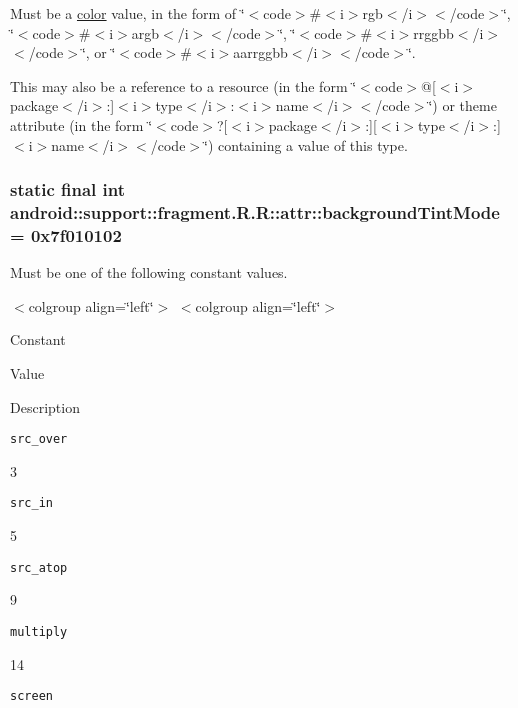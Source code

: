 Must be a \hyperlink{classandroid_1_1support_1_1fragment_1_1_r_1_1color}{color} value, in the form of \char`\"{}$<$code$>$\#$<$i$>$rgb$<$/i$>$$<$/code$>$\char`\"{}, \char`\"{}$<$code$>$\#$<$i$>$argb$<$/i$>$$<$/code$>$\char`\"{}, \char`\"{}$<$code$>$\#$<$i$>$rrggbb$<$/i$>$$<$/code$>$\char`\"{}, or \char`\"{}$<$code$>$\#$<$i$>$aarrggbb$<$/i$>$$<$/code$>$\char`\"{}. 

This may also be a reference to a resource (in the form \char`\"{}$<$code$>$@\mbox{[}$<$i$>$package$<$/i$>$:\mbox{]}$<$i$>$type$<$/i$>$:$<$i$>$name$<$/i$>$$<$/code$>$\char`\"{}) or theme attribute (in the form \char`\"{}$<$code$>$?\mbox{[}$<$i$>$package$<$/i$>$:\mbox{]}\mbox{[}$<$i$>$type$<$/i$>$:\mbox{]}$<$i$>$name$<$/i$>$$<$/code$>$\char`\"{}) containing a value of this type. \hypertarget{classandroid_1_1support_1_1fragment_1_1_r_1_1attr_470a8ed52797bb103dab4b7a45b0b920}{
\subsubsection[{backgroundTintMode}]{\setlength{\rightskip}{0pt plus 5cm}static final int android::support::fragment.R.R::attr::backgroundTintMode = 0x7f010102}}
\label{classandroid_1_1support_1_1fragment_1_1_r_1_1attr_470a8ed52797bb103dab4b7a45b0b920}


Must be one of the following constant values. \begin{TabularC}{0}
\hline
\end{TabularC}
$<$colgroup align=\char`\"{}left\char`\"{}$>$ $<$colgroup align=\char`\"{}left\char`\"{}$>$ 

Constant

Value

Description 

{\tt src\_\-over}

3

{\tt src\_\-in}

5

{\tt src\_\-atop}

9

{\tt multiply}

14

{\tt screen}

